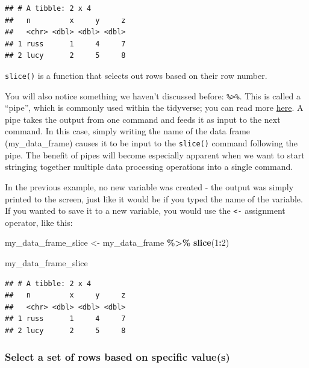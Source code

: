 \documentclass[
  12pt,
]{book}
\newenvironment{Shaded}{\begin{snugshade}}{\end{snugshade}}
\newcommand{\DecValTok}[1]{\textcolor[rgb]{0.00,0.00,0.81}{#1}}
\newcommand{\FunctionTok}[1]{\textcolor[rgb]{0.13,0.29,0.53}{\textbf{#1}}}
\newcommand{\NormalTok}[1]{#1}
\newcommand{\OtherTok}[1]{\textcolor[rgb]{0.56,0.35,0.01}{#1}}
\newcommand{\SpecialCharTok}[1]{\textcolor[rgb]{0.81,0.36,0.00}{\textbf{#1}}}
\begin{document}
\begin{verbatim}
## # A tibble: 2 x 4
##   n         x     y     z
##   <chr> <dbl> <dbl> <dbl>
## 1 russ      1     4     7
## 2 lucy      2     5     8
\end{verbatim}

\texttt{slice()} is a function that selects out rows based on their row number.

You will also notice something we haven't discussed before: \texttt{\%\textgreater{}\%}. This is called a ``pipe'', which is commonly used within the tidyverse; you can read more \href{http://magrittr.tidyverse.org/}{here}. A pipe takes the output from one command and feeds it as input to the next command. In this case, simply writing the name of the data frame (my\_data\_frame) causes it to be input to the \texttt{slice()} command following the pipe. The benefit of pipes will become especially apparent when we want to start stringing together multiple data processing operations into a single command.

In the previous example, no new variable was created - the output was simply printed to the screen, just like it would be if you typed the name of the variable. If you wanted to save it to a new variable, you would use the \texttt{\textless{}-} assignment operator, like this:

\begin{Shaded}
\begin{Highlighting}[]
\NormalTok{my\_data\_frame\_slice }\OtherTok{\textless{}{-}}\NormalTok{ my\_data\_frame }\SpecialCharTok{\%\textgreater{}\%} 
  \FunctionTok{slice}\NormalTok{(}\DecValTok{1}\SpecialCharTok{:}\DecValTok{2}\NormalTok{) }

\NormalTok{my\_data\_frame\_slice}
\end{Highlighting}
\end{Shaded}

\begin{verbatim}
## # A tibble: 2 x 4
##   n         x     y     z
##   <chr> <dbl> <dbl> <dbl>
## 1 russ      1     4     7
## 2 lucy      2     5     8
\end{verbatim}

\hypertarget{select-a-set-of-rows-based-on-specific-values}{%
\subsubsection{Select a set of rows based on specific value(s)}\label{select-a-set-of-rows-based-on-specific-values}}
\end{document}
